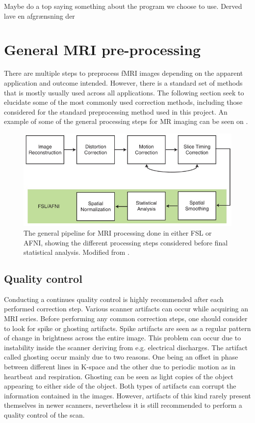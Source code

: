 Maybe do a top saying something about the program we choose to use. Derved lave en afgrænsning der 

\section{General MRI pre-processing}
There are multiple steps to preprocess fMRI images depending on the apparent application and outcome intended. However, there is a standard set of methods that is mostly usually used across all applications. The following section seek to elucidate some of the most commonly used correction methods, including those considered for the standard preprocessing method used in this project. An example of some of the general processing steps for MR imaging can be seen on .\cite{Poldrack2011} 

\begin{figure}[H]                 
	\includegraphics[width=.8\textwidth]{figures/aBackground/processing}  
	\caption{The general pipeline for MRI processing done in either FSL or AFNI, showing the different processing steps considered before final statistical analysis. Modified from \cite{Poldrack2011}.}
	\label{fig:back:pipeline} 
\end{figure}


\subsection{Quality control}
Conducting a continues quality control is highly recommended after each performed correction step. Various scanner artifacts can occur while acquiring an MRI series. Before performing any common correction steps, one should consider to look for spike or ghosting artifacts. Spike artifacts are seen as a regular pattern of change in brightness across the entire image. This problem can occur due to instability inside the scanner deriving from e.g. electrical discharges.  
The artifact called ghosting occur mainly due to two reasons. One being an offset in phase between different lines in K-space and the other due to periodic motion as in heartbeat and respiration. Ghosting can be seen as light copies of the object appearing to either side of the object. Both types of artifacts can corrupt the information contained in the images. However, artifacts of this kind rarely present themselves in newer scanners, nevertheless it is still recommended to perform a quality control of the scan.\cite{Poldrack2011}

